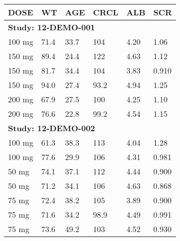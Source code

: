 {\def\arraystretch{1.4}\tabcolsep=5pt
\begin{threeparttable}
\begin{tabular}[h]{llllll}
\hline
DOSE & WT & AGE & CRCL & ALB & SCR \\
\hline
\multicolumn{6}{l}{\textbf{Study:  12-DEMO-001}}\\
100 mg & 71.4 & 33.7 & 104 & 4.20 & 1.06 \\
150 mg & 89.4 & 24.4 & 122 & 4.63 & 1.12 \\
150 mg & 81.7 & 34.4 & 104 & 3.83 & 0.910 \\
150 mg & 94.0 & 27.4 & 93.2 & 4.94 & 1.25 \\
200 mg & 67.9 & 27.5 & 100 & 4.25 & 1.10 \\
200 mg & 76.6 & 22.8 & 99.2 & 4.54 & 1.15 \\
\hline \multicolumn{6}{l}{\textbf{Study:  12-DEMO-002}}\\
100 mg & 61.3 & 38.3 & 113 & 4.04 & 1.28 \\
100 mg & 77.6 & 29.9 & 106 & 4.31 & 0.981 \\
50 mg & 74.1 & 37.1 & 112 & 4.44 & 0.900 \\
50 mg & 71.2 & 34.1 & 106 & 4.63 & 0.868 \\
75 mg & 72.4 & 38.2 & 105 & 3.89 & 0.900 \\
75 mg & 71.6 & 34.2 & 98.9 & 4.49 & 0.991 \\
75 mg & 73.6 & 49.2 & 103 & 4.52 & 0.930 \\
\hline
\end{tabular}
\end{threeparttable}
}
